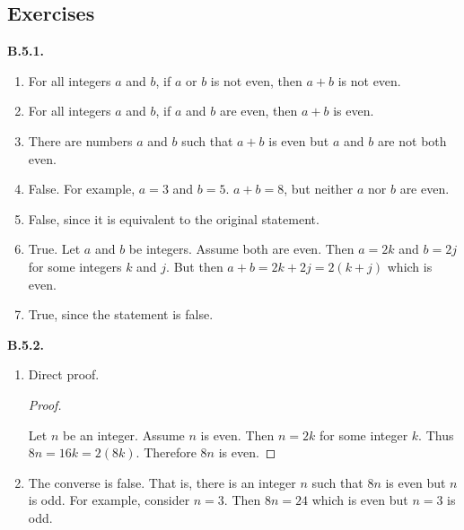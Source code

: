 \documentclass[10pt,]{book}
\theoremstyle{plain}
\theoremstyle{definition}
\theoremstyle{definition}
\theoremstyle{definition}
\theoremstyle{definition}
\numberwithin{equation}{chapter}
\begin{document}
\subsection*{ Exercises}
\noindent\textbf{B.5.1.} \hypertarget{p-2009}{}%
\leavevmode%
\begin{enumerate}[label=(\alph*)]
\item\hypertarget{li-691}{}\hypertarget{p-2010}{}%
For all integers \(a\) and \(b\), if \(a\) or \(b\) is not even, then \(a+b\) is not even.%
\item\hypertarget{li-692}{}\hypertarget{p-2011}{}%
For all integers \(a\) and \(b\), if \(a\) and \(b\) are even, then \(a+b\) is even.%
\item\hypertarget{li-693}{}\hypertarget{p-2012}{}%
There are numbers \(a\) and \(b\) such that \(a+b\) is even but \(a\) and \(b\) are not both even.%
\item\hypertarget{li-694}{}\hypertarget{p-2013}{}%
False. For example, \(a = 3\) and \(b = 5\). \(a+b = 8\), but neither \(a\) nor \(b\) are even.%
\item\hypertarget{li-695}{}\hypertarget{p-2014}{}%
False, since it is equivalent to the original statement.%
\item\hypertarget{li-696}{}\hypertarget{p-2015}{}%
True. Let \(a\) and \(b\) be integers. Assume both are even. Then \(a = 2k\) and \(b = 2j\) for some integers \(k\) and \(j\). But then \(a+b = 2k + 2j = 2(k+j)\) which is even.%
\item\hypertarget{li-697}{}\hypertarget{p-2016}{}%
True, since the statement is false.%
\end{enumerate}
%
\par\smallskip
\noindent\textbf{B.5.2.} \hypertarget{p-2021}{}%
\leavevmode%
\begin{enumerate}[label=(\alph*)]
\item\hypertarget{li-700}{}\hypertarget{p-2022}{}%
Direct proof. \begin{proof}\hypertarget{proof-30}{}
\hypertarget{p-2023}{}%
Let \(n\) be an integer. Assume \(n\) is even. Then \(n = 2k\) for some integer \(k\). Thus \(8n = 16k = 2(8k)\). Therefore \(8n\) is even.%
\end{proof}
%
\item\hypertarget{li-701}{}\hypertarget{p-2024}{}%
The converse is false. That is, there is an integer \(n\) such that \(8n\) is even but \(n\) is odd. For example, consider \(n = 3\). Then \(8n = 24\) which is even but \(n = 3\) is odd.%
\end{enumerate}
%
\par\smallskip
\end{document}
